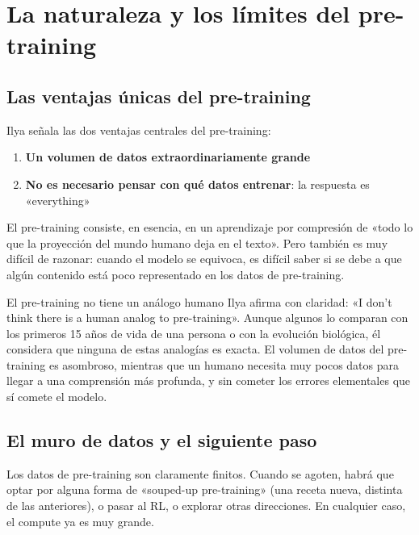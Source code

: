 \section{La naturaleza y los límites del pre-training}

\subsection{Las ventajas únicas del pre-training}

Ilya señala las dos ventajas centrales del pre-training:
\begin{enumerate}
    \item \textbf{Un volumen de datos extraordinariamente grande}
    \item \textbf{No es necesario pensar con qué datos entrenar}: la respuesta es «everything»
\end{enumerate}

El pre-training consiste, en esencia, en un aprendizaje por compresión de «todo lo que la proyección del mundo humano deja en el texto». Pero también es muy difícil de razonar: cuando el modelo se equivoca, es difícil saber si se debe a que algún contenido está poco representado en los datos de pre-training.

\begin{warningbox}{El pre-training no tiene un análogo humano}
Ilya afirma con claridad: «I don't think there is a human analog to pre-training». Aunque algunos lo comparan con los primeros 15 años de vida de una persona o con la evolución biológica, él considera que ninguna de estas analogías es exacta. El volumen de datos del pre-training es asombroso, mientras que un humano necesita muy pocos datos para llegar a una comprensión más profunda, y sin cometer los errores elementales que sí comete el modelo.
\end{warningbox}

\subsection{El muro de datos y el siguiente paso}

Los datos de pre-training son claramente finitos. Cuando se agoten, habrá que optar por alguna forma de «souped-up pre-training» (una receta nueva, distinta de las anteriores), o pasar al RL, o explorar otras direcciones. En cualquier caso, el compute ya es muy grande.

